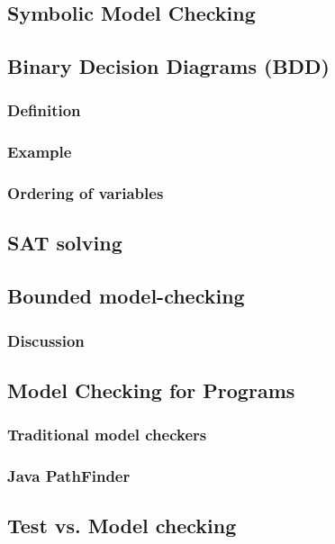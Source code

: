 \documentclass[12pt, a4paper]{book}
\begin{document}
  \subsection{Symbolic Model Checking}
  \label{sub:Symbolic Model Checking}
  \subsection{Binary Decision Diagrams (BDD)}
  \label{sub:Binary Decision Diagrams (BDD)}
  \subsubsection{Definition}
  \label{subs:Definition}
  \subsubsection{Example}
  \label{subs:Example}
  \subsubsection{Ordering of variables}
  \label{subs:Ordering of variables}
  \subsection{SAT solving}
  \label{sub:SAT solving}
  \subsection{Bounded model-checking}
  \label{sub:Bounded model-checking}
  \subsubsection{Discussion}
  \label{subs:Discussion}
  \subsection{Model Checking for Programs}
  \label{sub:Model Checking for Programs}
  \subsubsection{Traditional model checkers}
  \label{subs:Traditional model checkers}
  \subsubsection{Java PathFinder}
  \label{subs:Java PathFinder}
  \subsection{Test vs. Model checking}
  \label{sub:Test vs. Model checking}
\end{document}
